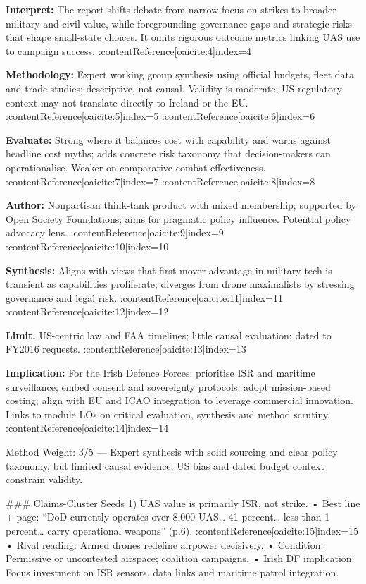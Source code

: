 \textbf{Interpret:} The report shifts debate from narrow focus on strikes to broader military and civil value, while foregrounding governance gaps and strategic risks that shape small-state choices. It omits rigorous outcome metrics linking UAS use to campaign success. :contentReference[oaicite:4]{index=4}

\textbf{Methodology:} Expert working group synthesis using official budgets, fleet data and trade studies; descriptive, not causal. Validity is moderate; US regulatory context may not translate directly to Ireland or the EU. :contentReference[oaicite:5]{index=5} :contentReference[oaicite:6]{index=6}

\textbf{Evaluate:} Strong where it balances cost with capability and warns against headline cost myths; adds concrete risk taxonomy that decision-makers can operationalise. Weaker on comparative combat effectiveness. :contentReference[oaicite:7]{index=7} :contentReference[oaicite:8]{index=8}

\textbf{Author:} Nonpartisan think-tank product with mixed membership; supported by Open Society Foundations; aims for pragmatic policy influence. Potential policy advocacy lens. :contentReference[oaicite:9]{index=9} :contentReference[oaicite:10]{index=10}

\textbf{Synthesis:} Aligns with views that first-mover advantage in military tech is transient as capabilities proliferate; diverges from drone maximalists by stressing governance and legal risk. :contentReference[oaicite:11]{index=11} :contentReference[oaicite:12]{index=12}

\textbf{Limit.} US-centric law and FAA timelines; little causal evaluation; dated to FY2016 requests. :contentReference[oaicite:13]{index=13}

\textbf{Implication:} For the Irish Defence Forces: prioritise ISR and maritime surveillance; embed consent and sovereignty protocols; adopt mission-based costing; align with EU and ICAO integration to leverage commercial innovation. Links to module LOs on critical evaluation, synthesis and method scrutiny. :contentReference[oaicite:14]{index=14}

Method Weight: 3/5 — Expert synthesis with solid sourcing and clear policy taxonomy, but limited causal evidence, US bias and dated budget context constrain validity.

### Claims-Cluster Seeds
1) UAS value is primarily ISR, not strike.  
• Best line + page: “DoD currently operates over 8,000 UAS… 41 percent… less than 1 percent… carry operational weapons” (p.6). :contentReference[oaicite:15]{index=15}  
• Rival reading: Armed drones redefine airpower decisively.  
• Condition: Permissive or uncontested airspace; coalition campaigns.  
• Irish DF implication: Focus investment on ISR sensors, data links and maritime patrol integration.

